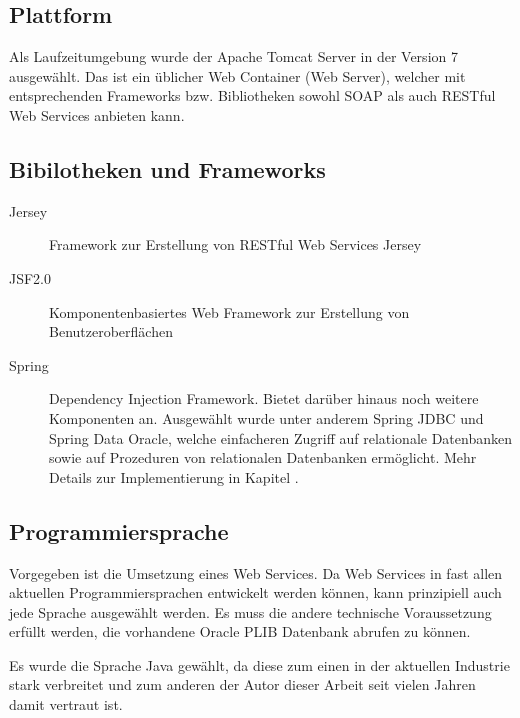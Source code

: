 \subsection{Plattform} 
Als Laufzeitumgebung wurde der Apache Tomcat Server in der Version 7 ausgewählt. Das ist ein üblicher Web Container (Web Server), welcher mit entsprechenden Frameworks bzw. Bibliotheken sowohl \gls{SOAP} als auch RESTful Web Services anbieten kann. 

\subsection{Bibilotheken und Frameworks} \label{bibliotheken_und_frameworks}
\begin{description}

\item[Jersey] Framework zur Erstellung von RESTful Web Services \gls{Jersey}
\item[JSF2.0] Komponentenbasiertes Web Framework zur Erstellung von Benutzeroberflächen 
\item[Spring] Dependency Injection Framework. Bietet darüber hinaus noch weitere Komponenten an. Ausgewählt wurde unter anderem \gls{Spring} JDBC und \gls{Spring} Data Oracle, welche einfacheren Zugriff auf relationale Datenbanken sowie auf Prozeduren von relationalen Datenbanken ermöglicht. Mehr Details zur Implementierung in Kapitel .  
    
\end{description}


\subsection{Programmiersprache}
Vorgegeben ist die Umsetzung eines Web Services. Da Web Services in fast allen aktuellen Programmiersprachen entwickelt werden können, kann prinzipiell auch jede Sprache ausgewählt werden. 
Es muss die andere technische Voraussetzung erfüllt werden, die vorhandene Oracle PLIB Datenbank abrufen zu können. 

Es wurde die Sprache Java gewählt, da diese zum einen in der aktuellen Industrie stark verbreitet  und zum anderen der Autor dieser Arbeit seit vielen Jahren damit vertraut ist. 

